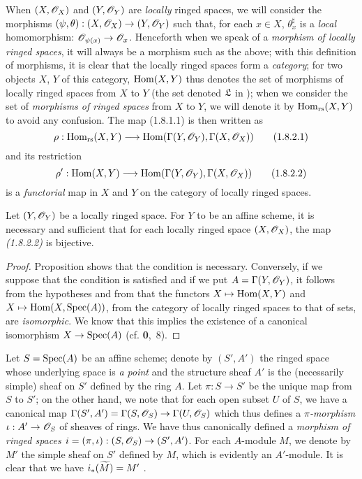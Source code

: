 \begin{env}[1.8.2]
\label{1.1.8.2}
When $(X,\mathscr{O}_X)$ and $(Y,\mathscr{O}_Y)$ are \emph{locally} ringed spaces, we will consider the
morphisms $(\psi,\theta):(X,\mathscr{O}_X)\to(Y,\mathscr{O}_Y)$ such that, for each $x\in X$,
$\theta_x^\sharp$ is a \emph{local} homomorphism: $\mathscr{O}_{\psi(x)}\to\mathscr{O}_x$. Henceforth when
we speak
of a \emph{morphism of locally ringed spaces}, it will always be a morphism such as the
above; with this definition of morphisms, it is clear that the locally ringed spaces form a
\emph{category}; for two objects $X$, $Y$ of this category, ${\mathop{\mathrm{Hom}}\nolimits}(X,Y)$ thus denotes the set
of morphisms of locally ringed spaces from $X$ to $Y$ (the set denoted $\mathfrak{L}$ in
); when we consider the set of \emph{morphisms of ringed spaces} from $X$
to $Y$, we will denote it by ${\mathop{\mathrm{Hom}}\nolimits}_\text{rs}(X,Y)$ to avoid any confusion. The map (1.8.1.1)
is then written as
\[
  \rho:{\mathop{\mathrm{Hom}}\nolimits}_\text{rs}(X,Y)\longrightarrow{\mathop{\mathrm{Hom}}\nolimits}(\Gamma(Y,\mathscr{O}_Y),\Gamma(X,\mathscr{O}_X))
  \tag{1.8.2.1}
\]
and its restriction
\[
  \rho':{\mathop{\mathrm{Hom}}\nolimits}(X,Y)\longrightarrow{\mathop{\mathrm{Hom}}\nolimits}(\Gamma(Y,\mathscr{O}_Y),\Gamma(X,\mathscr{O}_X))
  \tag{1.8.2.2}
\]
is a \emph{functorial} map in $X$ and $Y$ on the category of locally ringed spaces.
\end{env}

\begin{cor}[1.8.3]
\label{1.1.8.3}
Let $(Y,\mathscr{O}_Y)$ be a locally ringed space. For $Y$ to be an affine scheme, it is necessary
and sufficient that for each locally ringed space $(X,\mathscr{O}_X)$, the map \emph{(1.8.2.2)} is
bijective.
\end{cor}

\begin{proof}
\label{proof-1.1.8.3}
Proposition  shows that the condition is necessary. Conversely, if we
suppose that the condition is satisfied and if we put $A=\Gamma(Y,\mathscr{O}_Y)$, it follows from
the hypotheses and from  that the functors $X\mapsto{\mathop{\mathrm{Hom}}\nolimits}(X,Y)$ and
$X\mapsto{\mathop{\mathrm{Hom}}\nolimits}(X,{\mathop{\mathrm{Spec}}\nolimits}(A))$, from the category of locally ringed spaces to that of sets, are
\emph{isomorphic}. We know that this implies the existence of a canonical isomorphism
$X\to{\mathop{\mathrm{Spec}}\nolimits}(A)$ (cf. \textbf{0},~8).
\end{proof}

\begin{env}[1.8.4]
\label{1.1.8.4}
Let $S={\mathop{\mathrm{Spec}}\nolimits}(A)$ be an affine scheme; denote by $(S',A')$ the ringed space whose underlying
space is \emph{a point} and the structure sheaf $A'$ is the (necessarily simple)
sheaf on $S'$ defined by the ring $A$. Let $\pi:S\to S'$ be the unique map from $S$ to $S'$;
on the other hand, we note that for each open subset $U$ of $S$, we have a canonical map
$\Gamma(S',A')=\Gamma(S,\mathscr{O}_S)\to\Gamma(U,\mathscr{O}_S)$ which thus defines a \emph{$\pi$-morphism}
$\iota:A'\to\mathscr{O}_S$ of sheaves of rings. We have thus canonically defined a \emph{morphism of
ringed spaces $i=(\pi,\iota):(S,\mathscr{O}_S)\to(S',A')$}. For each $A$-module $M$, we denote by
$M'$ the simple sheaf on $S'$ defined by $M$, which is evidently an $A'$-module. It is clear
that we have $i_*(\widetilde{M})=M'$ .
\end{env}

